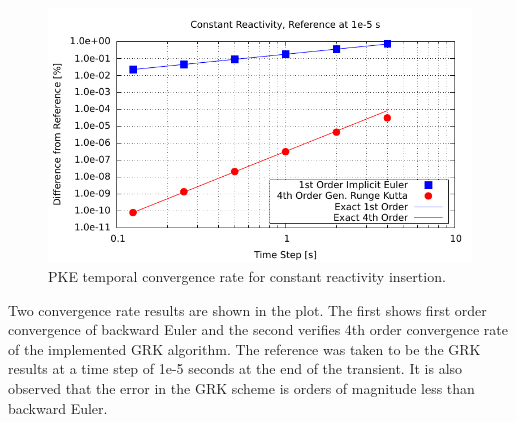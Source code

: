 \documentclass{ansconf}
\numberwithin{equation}{section}
\begin{document}
\begin{figure} 
\centering \includegraphics[scale=1.00]{./figs/pk_rho_const_order.pdf}
\caption{PKE temporal convergence rate for constant reactivity insertion.}
\label{fig:pk_rho_const_order}
\end{figure}
Two convergence rate results are shown in the plot. The first shows first order convergence of backward Euler and the second verifies 4th order convergence rate of the implemented GRK algorithm.  The reference was taken to be the GRK results at a time step of 1e-5 seconds at the end of the transient. It is also observed that the error in the GRK scheme is orders of magnitude less than backward Euler.
\end{document}
